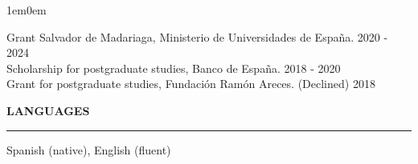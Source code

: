 \documentclass[12pt]{article}
\begin{document}
\begin{adjustwidth}{1em}{0em} %

Grant Salvador de Madariaga, Ministerio de Universidades de España. \hfill 2020 - 2024 \\
Scholarship for postgraduate studies, Banco de España. \hfill 2018 - 2020 \\
Grant for postgraduate studies, Fundación Ramón Areces. (Declined) \hfill 2018\\
\end{adjustwidth}

\vspace{0.5em} %
\noindent\textbf{LANGUAGES}\\
\noindent\rule[8pt]{\textwidth}{0.5pt}

 \vspace{0.5pt} %
Spanish (native), English (fluent) \\



%
%


\end{document}
